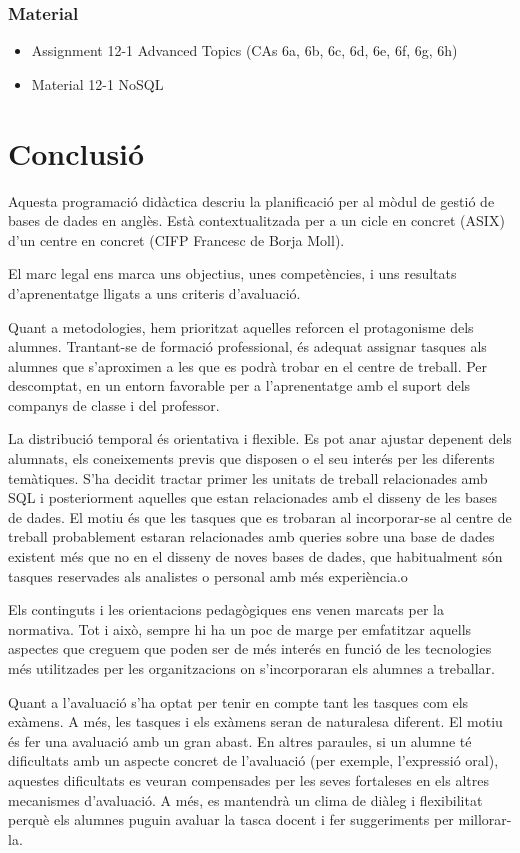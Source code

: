 \documentclass[catalan, a4paper, 12pt, titlepage]{article}
\begin{document}
  \subsubsection{Material}
  \begin{itemize}
	  \item Assignment 12-1 Advanced Topics (CAs 6a, 6b, 6c, 6d, 6e, 6f, 6g, 6h)
	  \item Material 12-1 NoSQL
  \end{itemize}


\section{Conclusió}

Aquesta programació didàctica descriu la planificació per al mòdul de gestió de bases de dades en anglès.
Està contextualitzada per a un cicle en concret (ASIX) d'un centre en concret (CIFP Francesc de Borja Moll).

El marc legal ens marca uns objectius, unes competències, i uns resultats d'aprenentatge lligats a uns criteris d'avaluació.

Quant a metodologies, hem prioritzat aquelles reforcen el protagonisme dels alumnes.
Trantant-se de formació professional, és adequat assignar tasques als alumnes que s'aproximen a les que es podrà trobar en el centre de treball.
Per descomptat, en un entorn favorable per a l'aprenentatge amb el suport dels companys de classe i del professor.

La distribució temporal és orientativa i flexible.
Es pot anar ajustar depenent dels alumnats, els coneixements previs que disposen o el seu interés per les diferents temàtiques.
S'ha decidit tractar primer les unitats de treball relacionades amb SQL i posteriorment aquelles que estan relacionades amb el disseny de les bases de dades.
El motiu és que les tasques que es trobaran al incorporar-se al centre de treball probablement estaran relacionades amb queries sobre una base de dades existent més que no en el disseny de noves bases de dades, que habitualment són tasques reservades als analistes o personal amb més experiència.o

Els continguts i les orientacions pedagògiques ens venen marcats per la normativa.
Tot i això, sempre hi ha un poc de marge per emfatitzar aquells aspectes que creguem que poden ser de més interés en funció de les tecnologies més utilitzades per les organitzacions on s'incorporaran els alumnes a treballar.

Quant a l'avaluació s'ha optat per tenir en compte tant les tasques com els exàmens.
A més, les tasques i els exàmens seran de naturalesa diferent.
El motiu és fer una avaluació amb un gran abast.
En altres paraules, si un alumne té dificultats amb un aspecte concret de l'avaluació (per exemple, l'expressió oral), aquestes dificultats es veuran compensades per les seves fortaleses en els altres mecanismes d'avaluació.
A més, es mantendrà un clima de diàleg i flexibilitat perquè els alumnes puguin avaluar la tasca docent i fer suggeriments per millorar-la.
\end{document}
